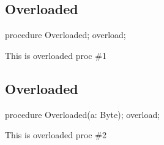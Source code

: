 \documentclass{report}
\begin{document}
\subsection*{Overloaded}
\begin{list}{}{
\setlength{\itemindent}{0cm}
\setlength{\listparindent}{0cm}
\setlength{\leftmargin}{\evensidemargin}
\addtolength{\leftmargin}{\tmplength}
\settowidth{\labelsep}{X}
\addtolength{\leftmargin}{\labelsep}
\setlength{\labelwidth}{\tmplength}
}
\begin{flushleft}
\item[\textbf{Declaration}\hfill]
\begin{ttfamily}
procedure Overloaded; overload;\end{ttfamily}


\end{flushleft}
\par
\item[\textbf{Description}]
This is overloaded proc {\#}1

\end{list}
\subsection*{Overloaded}
\begin{list}{}{
\setlength{\itemindent}{0cm}
\setlength{\listparindent}{0cm}
\setlength{\leftmargin}{\evensidemargin}
\addtolength{\leftmargin}{\tmplength}
\settowidth{\labelsep}{X}
\addtolength{\leftmargin}{\labelsep}
\setlength{\labelwidth}{\tmplength}
}
\begin{flushleft}
\item[\textbf{Declaration}\hfill]
\begin{ttfamily}
procedure Overloaded(a: Byte); overload;\end{ttfamily}


\end{flushleft}
\par
\item[\textbf{Description}]
This is overloaded proc {\#}2

\end{list}
\end{document}
